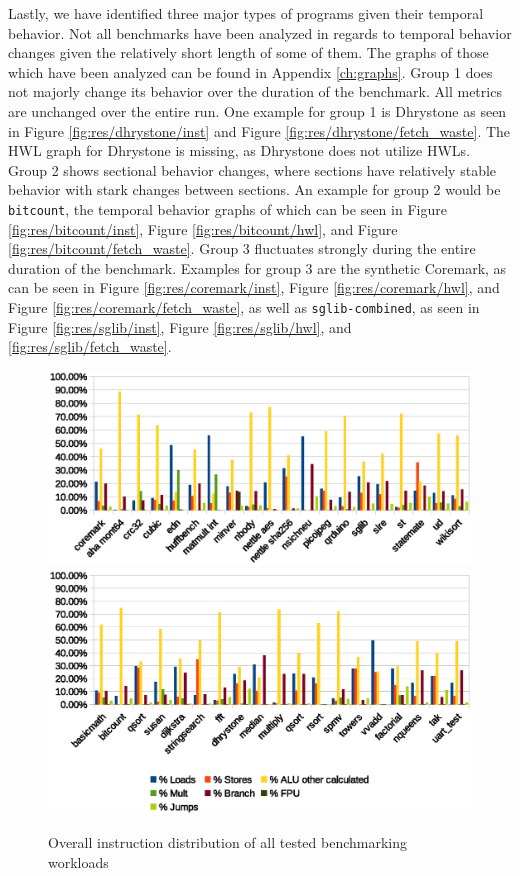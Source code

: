 \documentclass[../bachelor_paper.tex]{subfiles}
\begin{document}
Lastly, we have identified three major types of programs given their temporal behavior. Not all benchmarks have been analyzed in regards to temporal behavior changes given the relatively short length of some of them. The graphs of those which have been analyzed can be found in Appendix \ref{ch:graphs}. Group 1 does not majorly change its behavior over the duration of the benchmark. All metrics are unchanged over the entire run. One example for group 1 is Dhrystone as seen in Figure \ref{fig:res/dhrystone/inst} and Figure \ref{fig:res/dhrystone/fetch_waste}. The \ac{HWL} graph for Dhrystone is missing, as Dhrystone does not utilize \acp{HWL}. Group 2 shows sectional behavior changes, where sections have relatively stable behavior with stark changes between sections. An example for group 2 would be \texttt{bitcount}, the temporal behavior graphs of which can be seen in Figure \ref{fig:res/bitcount/inst}, Figure \ref{fig:res/bitcount/hwl}, and Figure \ref{fig:res/bitcount/fetch_waste}. Group 3 fluctuates strongly during the entire duration of the benchmark. Examples for group 3 are the synthetic Coremark, as can be seen in Figure \ref{fig:res/coremark/inst}, Figure \ref{fig:res/coremark/hwl}, and Figure \ref{fig:res/coremark/fetch_waste}, as well as \texttt{sglib-combined}, as seen in Figure \ref{fig:res/sglib/inst}, Figure \ref{fig:res/sglib/hwl}, and \ref{fig:res/sglib/fetch_waste}.

\begin{figure}
    \centering
    \includegraphics[width=\textwidth]{img/graph/overall_inst_dist}
    \includegraphics[width=\textwidth]{img/graph/overall_inst_dist2}
    \caption{Overall instruction distribution of all tested benchmarking workloads}
    \label{fig:res/overall/inst}
\end{figure}
\end{document}
